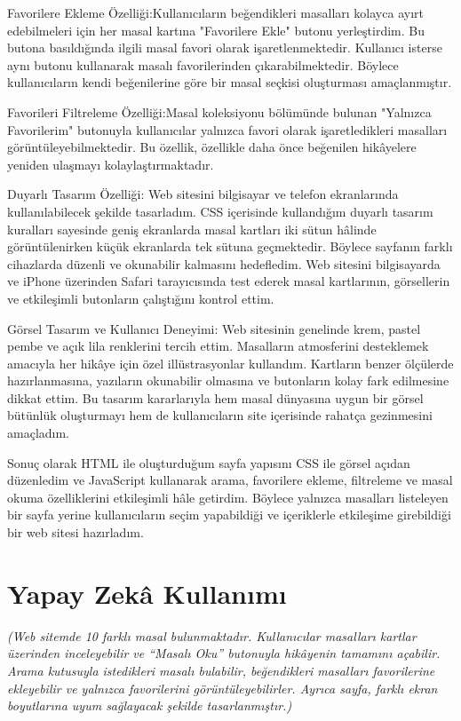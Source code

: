 \documentclass[12pt,a4paper]{article}
\newcommand{\aciklama}[1]{{\color{gray}\itshape (#1)}}
\begin{document}
Favorilere Ekleme Özelliği:Kullanıcıların beğendikleri masalları kolayca ayırt edebilmeleri için her masal kartına "Favorilere Ekle" butonu yerleştirdim. Bu butona basıldığında ilgili masal favori olarak işaretlenmektedir. Kullanıcı isterse aynı butonu kullanarak masalı favorilerinden çıkarabilmektedir. Böylece kullanıcıların kendi beğenilerine göre bir masal seçkisi oluşturması amaçlanmıştır.

Favorileri Filtreleme Özelliği:Masal koleksiyonu bölümünde bulunan "Yalnızca Favorilerim" butonuyla kullanıcılar yalnızca favori olarak işaretledikleri masalları görüntüleyebilmektedir. Bu özellik, özellikle daha önce beğenilen hikâyelere yeniden ulaşmayı kolaylaştırmaktadır.

Duyarlı Tasarım Özelliği: Web sitesini bilgisayar ve telefon ekranlarında kullanılabilecek şekilde tasarladım. CSS içerisinde kullandığım duyarlı tasarım kuralları sayesinde geniş ekranlarda masal kartları iki sütun hâlinde görüntülenirken küçük ekranlarda tek sütuna geçmektedir. Böylece sayfanın farklı cihazlarda düzenli ve okunabilir kalmasını hedefledim. Web sitesini bilgisayarda ve iPhone üzerinden Safari tarayıcısında test ederek masal kartlarının, görsellerin ve etkileşimli butonların çalıştığını kontrol ettim.

Görsel Tasarım ve Kullanıcı Deneyimi: Web sitesinin genelinde krem, pastel pembe ve açık lila renklerini tercih ettim. Masalların atmosferini desteklemek amacıyla her hikâye için özel illüstrasyonlar kullandım. Kartların benzer ölçülerde hazırlanmasına, yazıların okunabilir olmasına ve butonların kolay fark edilmesine dikkat ettim. Bu tasarım kararlarıyla hem masal dünyasına uygun bir görsel bütünlük oluşturmayı hem de kullanıcıların site içerisinde rahatça gezinmesini amaçladım.

Sonuç olarak HTML ile oluşturduğum sayfa yapısını CSS ile görsel açıdan düzenledim ve JavaScript kullanarak arama, favorilere ekleme, filtreleme ve masal okuma özelliklerini etkileşimli hâle getirdim. Böylece yalnızca masalları listeleyen bir sayfa yerine kullanıcıların seçim yapabildiği ve içeriklerle etkileşime girebildiği bir web sitesi hazırladım.

\section{Yapay Zekâ Kullanımı}
\aciklama {Web sitemde 10 farklı masal bulunmaktadır. Kullanıcılar masalları kartlar üzerinden inceleyebilir ve “Masalı Oku” butonuyla hikâyenin tamamını açabilir. Arama kutusuyla istedikleri masalı bulabilir, beğendikleri masalları favorilerine ekleyebilir ve yalnızca favorilerini görüntüleyebilirler. Ayrıca sayfa, farklı ekran boyutlarına uyum sağlayacak şekilde tasarlanmıştır.}
\end{document}
